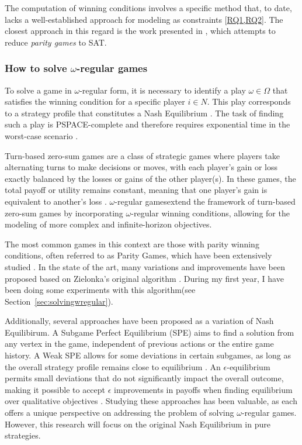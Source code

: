 \documentclass{article}
\makeatletter
\newcommand{\wregularform}{$\omega$-regular form\@ifnextchar{,}{}{\@ifnextchar{.}{}{ }}}
\newcommand{\wregulargames}{$\omega$-regular games\@ifnextchar{,}{}{\@ifnextchar{.}{}{ }}}
\makeatother
\begin{document}
The computation of winning conditions involves a specific method that, to date, lacks a well-established approach for modeling as constraints [\hyperref[sec:rq]{RQ1,RQ2}]. The closest approach in this regard is the work presented in \cite{HELJANKO2012430}, which attempts to reduce \textit{parity games} to SAT.

\subsubsection{How to solve $\omega$-regular games}\label{sec:solvewregular}

To solve a game in \wregularform, it is necessary to identify a play $\omega \in \Omega$ that satisfies the winning condition for a specific player $i \in N$. This play corresponds to a strategy profile that constitutes a Nash Equilibrium \cite{BruyereVeronique2022AGAf,LéonardBrice2022TCoS}. The task of finding such a play is PSPACE-complete and therefore requires exponential time in the worst-case scenario \cite{ChatterjeeKrishnendu2012Asos,LéonardBrice2022TCoS,BruyereVeronique2022AGAf,BruyereVeronique2021Oteo}.

Turn-based zero-sum games are a class of strategic games where players take alternating turns to make decisions or moves, with each player's gain or loss exactly balanced by the losses or gains of the other player(s). In these games, the total payoff or utility remains constant, meaning that one player's gain is equivalent to another's loss \cite{ChatterjeeKrishnendu2012Asos, SohailSaqib2013Sfat, Erich2008SCaA, BruyereVeronique2021Oteo}. \wregulargames extend the framework of turn-based zero-sum games by incorporating $\omega$-regular winning conditions, allowing for the modeling of more complex and infinite-horizon objectives.

The most common games in this context are those with parity winning conditions, often referred to as Parity Games, which have been extensively studied \cite{keiren2015}. In the state of the art, many variations and improvements have been proposed based on Zielonka's original algorithm \cite{ParysPaweł2019PGZA,aggarwal:2023,Gazda_2013}. During my first year, I have been doing some experiments with this algorithm(see Section~\ref{sec:solvingwregular}).

Additionally, several approaches have been proposed as a variation of Nash Equilibirum. A Subgame Perfect Equilibrium (SPE) \cite{LéonardBrice2022TCoS,BRIHAYE2021211} aims to find a solution from any vertex in the game, independent of previous actions or the entire game history. A Weak SPE allows for some deviations in certain subgames, as long as the overall strategy profile remains close to equilibrium \cite{brihaye2015,BruyereVeronique2021Oteo}. An $\epsilon$-equilibrium permits small deviations that do not significantly impact the overall outcome, making it possible to accept $\epsilon$ improvements in payoffs when finding equilibrium over qualitative objectives \cite{FleschJános2023Eits}.  Studying these approaches has been valuable, as each offers a unique perspective on addressing the problem of solving \wregulargames. However, this research will focus on the original Nash Equilibrium in pure strategies. 
\end{document}
